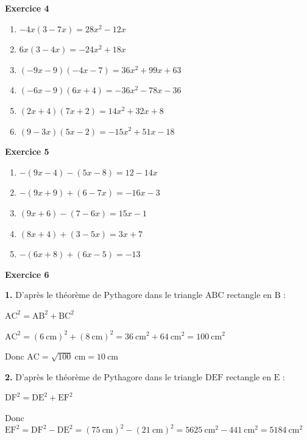 \documentclass[12pt,a4paper,french]{article}
\begin{document}
\noindent\textbf{Exercice 4}\par
\smallskip
\begin{enumerate}
\item $-4x(3 - 7x) = 28x^2 - 12x$
\item $6x(3 - 4x) = -24x^2 + 18x$
\item $(-9x - 9)(-4x - 7) = 36x^2 + 99x + 63$
\item $(-6x - 9)(6x + 4) = -36x^2 - 78x - 36$
\item $(2x + 4)(7x + 2) = 14x^2 + 32x + 8$
\item $(9 - 3x)(5x - 2) = -15x^2 + 51x - 18$
\end{enumerate}
\medskip

\noindent\textbf{Exercice 5}\par
\smallskip
\begin{enumerate}
\item $-(9x - 4)-(5x - 8) = 12 - 14x$
\item $-(9x + 9)+(6 - 7x) = -16x - 3$
\item $(9x + 6)-(7 - 6x) = 15x - 1$
\item $(8x + 4)+(3 - 5x) = 3x + 7$
\item $-(6x + 8)+(6x - 5) = -13$
\end{enumerate}
\medskip

\noindent\textbf{Exercice 6}\par
\smallskip
\textbf{1.} D'après le théorème de Pythagore dans le triangle \ensuremath{\mathrm{A}}\ensuremath{\mathrm{B}}\ensuremath{\mathrm{C}} rectangle en \ensuremath{\mathrm{B}} :

$\ensuremath{\mathrm{A}}\ensuremath{\mathrm{C}}^2 = \ensuremath{\mathrm{A}}\ensuremath{\mathrm{B}}^2 + \ensuremath{\mathrm{B}}\ensuremath{\mathrm{C}}^2$

$\ensuremath{\mathrm{A}}\ensuremath{\mathrm{C}}^2 = (6~\text{cm})^2 + (8~\text{cm})^2 = 36~\text{cm}^2 + 64~\text{cm}^2 = 100~\text{cm}^2$

Donc $\ensuremath{\mathrm{A}}\ensuremath{\mathrm{C}} = \sqrt{100}~\text{cm} = 10~\text{cm}$

\medskip
\textbf{2.} D'après le théorème de Pythagore dans le triangle \ensuremath{\mathrm{D}}\ensuremath{\mathrm{E}}\ensuremath{\mathrm{F}} rectangle en \ensuremath{\mathrm{E}} :

$\ensuremath{\mathrm{D}}\ensuremath{\mathrm{F}}^2 = \ensuremath{\mathrm{D}}\ensuremath{\mathrm{E}}^2 + \ensuremath{\mathrm{E}}\ensuremath{\mathrm{F}}^2$

Donc $\ensuremath{\mathrm{E}}\ensuremath{\mathrm{F}}^2 = \ensuremath{\mathrm{D}}\ensuremath{\mathrm{F}}^2 - \ensuremath{\mathrm{D}}\ensuremath{\mathrm{E}}^2 = (75~\text{cm})^2 - (21~\text{cm})^2 = 5625~\text{cm}^2 - 441~\text{cm}^2 = 5184~\text{cm}^2$
\end{document}
